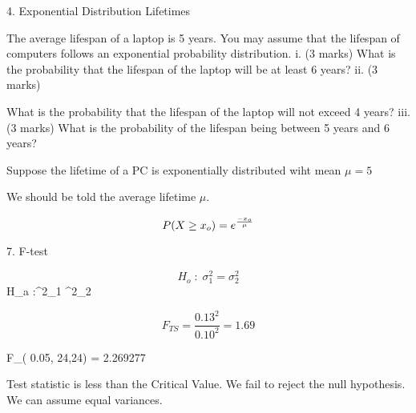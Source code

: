

4. Exponential Distribution Lifetimes

The average lifespan of a laptop is 5 years. You may assume that
the lifespan of computers follows an exponential probability
distribution.
i. (3 marks) What is the probability that the
lifespan of the laptop will be at least 6 years? ii. (3 marks)

What is the probability that the lifespan of the laptop will not
exceed 4 years? iii. (3 marks) What is the probability of the
lifespan being between 5 years and 6 years?


Suppose the lifetime of a PC is exponentially distributed wiht
mean $\mu =5$

We should be told the average lifetime $\mu$.

\[
P( X \geq x_o) = e^{{-x_o \over \mu}}
\]



7. F-test

\[
H_o \;:\;\sigma^2_1  =  \sigma^2_2
\]
H_a \;:\;\sigma^2_1\;  \neq \; \sigma^2_2

\[
F_{TS}  = \frac{0.13^2}{0.10^2}  = 1.69
\]

F_{( 0.05, 24,24)} = 2.269277

Test statistic is less than the Critical Value.
    We fail to reject the null hypothesis.
    We can assume equal variances.

